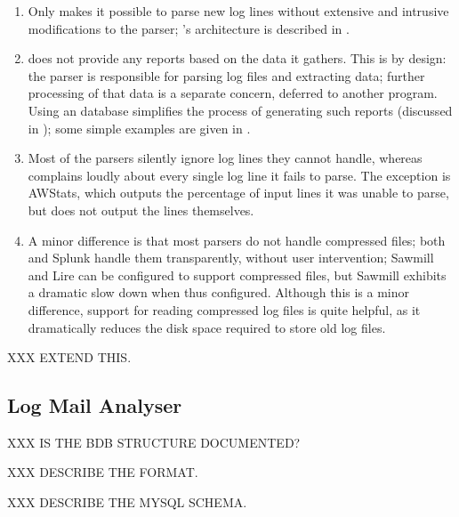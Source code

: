 \begin{enumerate}

    \item Only \parsername{} makes it possible to parse new log lines
        without extensive and intrusive modifications to the parser;
        \parsername{}'s architecture is described in .

    \item \parsername{} does not provide any reports based on the data it
        gathers.  This is by design: the parser is responsible for parsing
        log files and extracting data; further processing of that data is a
        separate concern, deferred to another program.  Using an \SQL{}
        database simplifies the process of generating such reports
        (discussed in ); some simple examples
        are given in .

    \item Most of the parsers silently ignore log lines they cannot handle,
        whereas \parsername{} complains loudly about every single log line
        it fails to parse.  The exception is AWStats, which outputs the
        percentage of input lines it was unable to parse, but does not
        output the lines themselves.

    \item A minor difference is that most parsers do not handle compressed
        files; both \parsername{} and Splunk handle them transparently,
        without user intervention; Sawmill and Lire can be configured to
        support compressed files, but Sawmill exhibits a dramatic slow down
        when thus configured.  Although this is a minor difference, support
        for reading compressed log files is quite helpful, as it
        dramatically reduces the disk space required to store old log
        files.

\end{enumerate}

XXX EXTEND THIS\@.

\subsection{Log Mail Analyser}

XXX IS THE BDB STRUCTURE DOCUMENTED\@?

XXX DESCRIBE THE \CSV{} FORMAT\@.

XXX DESCRIBE THE MYSQL SCHEMA\@.


